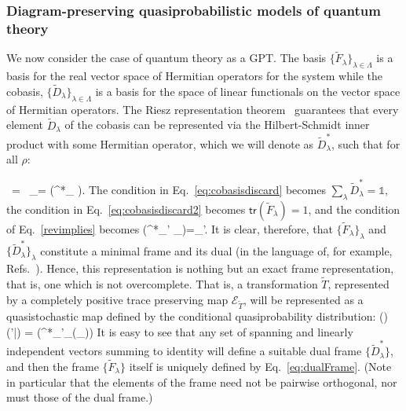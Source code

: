 \documentclass[10pt,twocolumn,aps,groupedaddress,nofootinbib]{revtex4}
\begin{document}
\subsubsection{Diagram-preserving quasiprobabilistic models of quantum theory }
We now consider the case of quantum theory as a GPT. The basis $\{\widetilde{F}_{\lambda}\}_{\lambda\in\Lambda}$ is a basis for the real vector space of Hermitian operators for the system while the cobasis, $\{\widetilde{D}_{\lambda}\}_{\lambda\in\Lambda}$ is a basis for the space of linear functionals on the vector space of Hermitian operators.  The Riesz representation theorem~\cite{riesz1914demonstration} guarantees that every element $\widetilde{D}_{\lambda}$ of the cobasis can be represented via the Hilbert-Schmidt inner product with some Hermitian operator, which we will denote as $\widetilde{D}^*_{\lambda}$, such that for all $\rho$:
\beq
{}
\ = \
_{\lambda}\circ \rho = (^*_{\lambda} \rho).
\eeq
The condition in Eq.~\eqref{eq:cobasisdiscard} becomes $\sum_\lambda \widetilde{D}^*_\lambda = \mathds{1}$, the condition in Eq.~\eqref{eq:cobasisdiscard2} becomes $\mathsf{tr}(\widetilde{F}_\lambda)=1$, and the condition of Eq.~\eqref{revimplies} becomes
\beq\label{eq:dualFrame}
(^*_{\lambda'} _\lambda)=\delta_{\lambda\lambda'}.
\eeq
It is clear, therefore, that $\{ \widetilde{F}_\lambda \}_\lambda$ and $\{ \widetilde{D}^*_\lambda \}_\lambda$ constitute a  minimal frame and its dual (in the language of, for example, Refs.~\cite{ferrie2008frame}). Hence, this representation is nothing but an exact frame representation, that is, one which is not overcomplete.
That is, a transformation $\widetilde{T}$, represented by a completely positive trace preserving map $\mathcal{E}_{\widetilde{T}}$, will be represented as a quasistochastic map defined by the conditional quasiprobability distribution:
\beq
\hat{\xi}()({\lambda'}|\lambda) = (^*_{\lambda'}_{}(_\lambda))
\eeq
It is easy to see that any set of spanning and linearly independent vectors summing to identity will define a suitable dual frame $\{\widetilde{D}^*_\lambda\}$, and then the frame $\{\widetilde{F}_\lambda\}$ itself is uniquely defined by Eq.~\eqref{eq:dualFrame}. (Note in particular that the elements of the frame need not be pairwise orthogonal, nor must those of the dual frame.)
\end{document}
